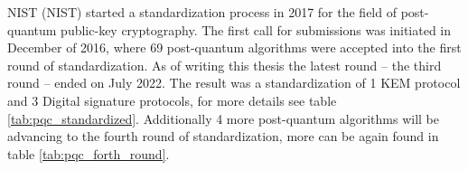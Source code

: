 NIST (\acl{NIST}) started a standardization process in 2017 for the field of post-quantum public-key cryptography. The first call for submissions was initiated in December of 2016, where 69 post-quantum algorithms were accepted into the first round of standardization. As of writing this thesis the latest round -- the third round -- ended on July 2022. The result was a standardization of 1 KEM protocol and 3 Digital signature protocols, for more details see table \ref{tab:pqc_standardized}. Additionally 4 more post-quantum algorithms will be advancing to the fourth round of standardization, more can be again found in table \ref{tab:pqc_forth_round}. \cite{Alagic2022}

